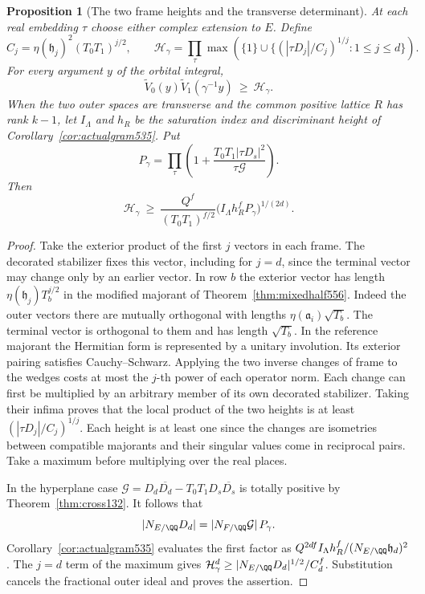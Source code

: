 \documentclass[a4paper,11pt]{article}
\newtheorem{proposition}{Proposition}[section]
\theoremstyle{definition}
\theoremstyle{remark}
\numberwithin{equation}{section}
\begin{document}
\begin{proposition}[The two frame heights and the transverse determinant]
\leavevmode\label{prop:transverseheight582}
At each real embedding \(\tau\) choose either complex
extension to \(E\). Define
\[
 C_j=\eta(\mathfrak h_j)^2(T_0T_1)^{j/2},\qquad
 \mathcal H_\gamma=
 \prod_\tau\max\left(\{1\}\cup
       \{(|\tau D_j|/C_j)^{1/j}:1\le j\le d\}\right).
\]
For every argument \(y\) of the orbital integral,
\[
  \widetilde V_0(y)\widetilde V_1(\gamma^{-1}y)
                      \ \ge\ \mathcal H_\gamma .
\]
When the two outer spaces are transverse and the common positive
lattice \(R\) has rank \(k-1\), let \(I_\Lambda\) and \(h_R\)
be the saturation index and discriminant height of
Corollary~\ref{cor:actualgram535}. Put
\[
    P_\gamma=\prod_\tau
       \left(1+\frac{T_0T_1|\tau D_s|^2}{\tau\mathcal G}\right).
\]
Then
\[
 \mathcal H_\gamma\ \ge\
 \frac{Q^f}{(T_0T_1)^{f/2}}
       \bigl(I_\Lambda h_R^f P_\gamma\bigr)^{1/(2d)} .
\]
\end{proposition}
\begin{proof}
Take the exterior product of the first \(j\) vectors in each
frame. The decorated stabilizer fixes this vector, including for
\(j=d\), since the terminal vector may change only by an
earlier vector. In row \(b\) the exterior vector has length
\(\eta(\mathfrak h_j)T_b^{j/2}\) in the modified majorant of
Theorem~\ref{thm:mixedhalf556}. Indeed the outer vectors there
are mutually orthogonal with lengths \(\eta(\mathfrak a_i)\sqrt{T_b}\).
The terminal vector is orthogonal to them and has length
\(\sqrt{T_b}\). In the reference majorant the Hermitian form
is represented by a unitary involution. Its exterior pairing
satisfies Cauchy--Schwarz. Applying the two inverse changes
of frame to the wedges costs at most the \(j\)-th power of
each operator norm. Each change can first be multiplied by
an arbitrary member of its own decorated stabilizer. Taking
their infima proves that the local product of the two heights
is at least \((|\tau D_j|/C_j)^{1/j}\). Each height is at
least one since the changes are isometries between compatible
majorants and their singular values come in reciprocal pairs.
Take a maximum before multiplying over the real places.

In the hyperplane case \(\mathcal G=D_d\overline{D_d}
-T_0T_1D_s\overline{D_s}\) is totally positive by
Theorem~\ref{thm:cross132}. It follows that
\[
 |N_{E/\QQ}D_d|=|N_{F/\QQ}\mathcal G|\,P_\gamma .
\]
Corollary~\ref{cor:actualgram535} evaluates the first factor as
\(Q^{2df}I_\Lambda h_R^f/(N_{E/\QQ}\mathfrak h_d)^2\).
The \(j=d\) term of the maximum gives
\(\mathcal H_\gamma^d\ge |N_{E/\QQ}D_d|^{1/2}/C_d^f\).
Substitution cancels the fractional outer ideal and proves
the assertion.
\end{proof}
\end{document}
